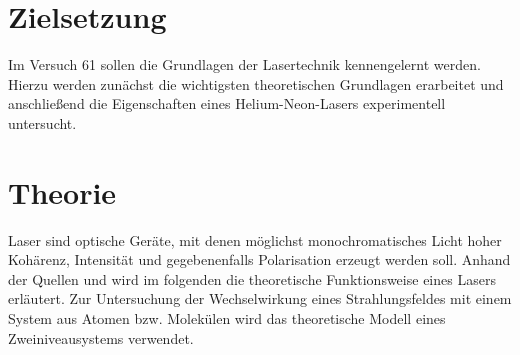 \setcounter{page}{1}
\section*{Zielsetzung}
Im Versuch 61 sollen die Grundlagen der Lasertechnik kennengelernt werden. Hierzu werden zunächst die
wichtigsten theoretischen Grundlagen erarbeitet und anschließend die Eigenschaften eines Helium-Neon-Lasers
experimentell untersucht.
\section{Theorie}
Laser sind optische Geräte, mit denen möglichst monochromatisches Licht hoher Kohärenz, Intensität und gegebenenfalls
Polarisation erzeugt werden soll. 
Anhand der Quellen \cite{anleitung61} und \cite{dem} wird im folgenden die theoretische Funktionsweise eines Lasers
erläutert. Zur Untersuchung der Wechselwirkung eines Strahlungsfeldes mit einem System aus Atomen bzw. Molekülen
wird das theoretische Modell eines Zweiniveausystems verwendet.
